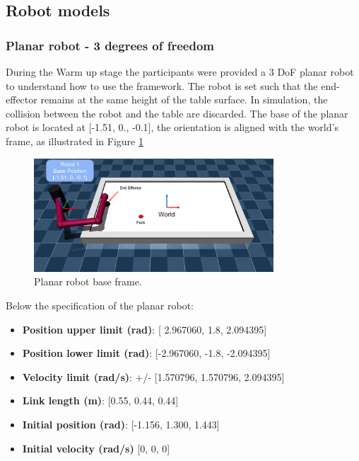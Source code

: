 \subsection{Robot models}
    \subsubsection{Planar robot - 3 degrees of freedom}
    During the Warm up stage the participants were provided a 3 DoF planar robot to understand how to use the framework.
    The robot is set such that the end-effector remains at the same height of the table surface. In simulation, the collision between the robot and the table are discarded.
    The base of the planar robot is located at [-1.51, 0., -0.1], the orientation is aligned with the world's frame, as illustrated in Figure \ref{fig:planar_env}

    \begin{figure}[h]
        \centering
        \includegraphics[width=0.8\textwidth]{Images/3dof_planar_env.png}
        \caption{Planar robot base frame.}
        \label{fig:planar_env}
    \end{figure}


    Below the specification of the planar robot:
    \begin{itemize}
        \item \textbf{Position upper limit (rad)}: [ 2.967060, 1.8, 2.094395]
        \item \textbf{Position lower limit (rad)}: [-2.967060, -1.8, -2.094395]
        \item \textbf{Velocity limit (rad/s)}: +/- [1.570796, 1.570796, 2.094395]
        \item \textbf{Link length (m)}: [0.55, 0.44, 0.44]
        \item \textbf{Initial position (rad)}: [-1.156, 1.300, 1.443]
        \item \textbf{Initial velocity (rad/s)} [0, 0, 0]
    \end{itemize}

